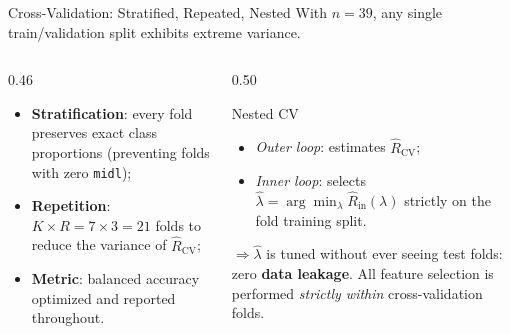 \documentclass[aspectratio=169, 10pt]{beamer}
\begin{document}
\begin{frame}{Cross-Validation: Stratified, Repeated, Nested}
  With $n = 39$, any single train/validation split exhibits extreme variance.

  \bigskip
  \begin{columns}[T]
    \begin{column}{0.46\textwidth}
      \begin{itemize}
        \item \textbf{Stratification}: every fold preserves exact class proportions (preventing folds with zero \texttt{midl});
        \item \textbf{Repetition}: $K \times R = 7 \times 3 = 21$ folds to reduce the variance of $\hat{R}_{\text{CV}}$;
        \item \textbf{Metric}: balanced accuracy optimized and reported throughout.
      \end{itemize}
    \end{column}

    \begin{column}{0.50\textwidth}
      \begin{block}{Nested CV}
        \begin{itemize}
          \item \textit{Outer loop}: estimates $\hat{R}_{\text{CV}}$;
          \item \textit{Inner loop}: selects $\hat{\lambda} = \arg\min_\lambda \hat{R}_{\text{in}}(\lambda)$ strictly on the fold training split.
        \end{itemize}
        $\Rightarrow \hat{\lambda}$ is tuned without ever seeing test folds: zero \textbf{data leakage}. All feature selection is performed \textit{strictly within} cross-validation folds.
      \end{block}
    \end{column}
  \end{columns}
\end{frame}
\end{document}
